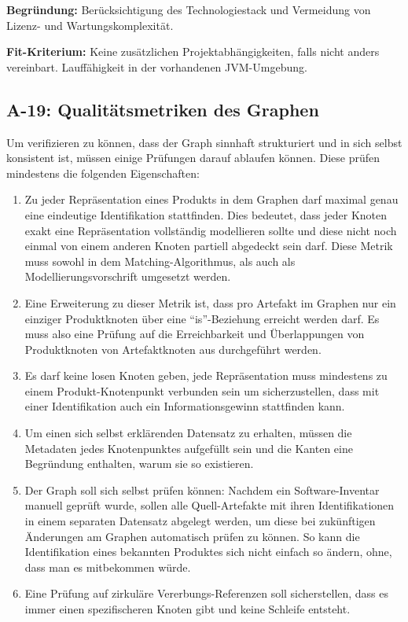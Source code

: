 \textbf{Begründung:}
Berücksichtigung des Technologiestack und Vermeidung von Lizenz- und Wartungskomplexität.

\textbf{Fit-Kriterium:}
Keine zusätzlichen Projektabhängigkeiten, falls nicht anders vereinbart.
Lauffähigkeit in der vorhandenen JVM-Umgebung.

\subsection{A-19: Qualitätsmetriken des Graphen}\label{subsec:req-graph-inner-consistency}

Um verifizieren zu können, dass der Graph sinnhaft strukturiert und in sich selbst konsistent ist, müssen einige Prüfungen darauf ablaufen können.
Diese prüfen mindestens die folgenden Eigenschaften:

\begin{enumerate}
    \item Zu jeder Repräsentation eines Produkts in dem Graphen darf maximal genau eine eindeutige Identifikation stattfinden.
    Dies bedeutet, dass jeder Knoten exakt eine Repräsentation vollständig modellieren sollte und diese nicht noch einmal von einem anderen Knoten partiell abgedeckt sein darf.
    Diese Metrik muss sowohl in dem Matching-Algorithmus, als auch als Modellierungsvorschrift umgesetzt werden.
    \item Eine Erweiterung zu dieser Metrik ist, dass pro Artefakt im Graphen nur ein einziger Produktknoten über eine \enquote{is}-Beziehung erreicht werden darf.
    Es muss also eine Prüfung auf die Erreichbarkeit und Überlappungen von Produktknoten von Artefaktknoten aus durchgeführt werden.
    \item Es darf keine losen Knoten geben, jede Repräsentation muss mindestens zu einem Produkt-Knotenpunkt verbunden sein um sicherzustellen, dass mit einer Identifikation auch ein Informationsgewinn stattfinden kann.
    \item Um einen sich selbst erklärenden Datensatz zu erhalten, müssen die Metadaten jedes Knotenpunktes aufgefüllt sein und die Kanten eine Begründung enthalten, warum sie so existieren.
    \item Der Graph soll sich selbst prüfen können: Nachdem ein Software-Inventar manuell geprüft wurde, sollen alle Quell-Artefakte mit ihren Identifikationen in einem separaten Datensatz abgelegt werden, um diese bei zukünftigen Änderungen am Graphen automatisch prüfen zu können.
    So kann die Identifikation eines bekannten Produktes sich nicht einfach so ändern, ohne, dass man es mitbekommen würde.
    \item Eine Prüfung auf zirkuläre Vererbungs-Referenzen soll sicherstellen, dass es immer einen spezifischeren Knoten gibt und keine Schleife entsteht.
\end{enumerate}
